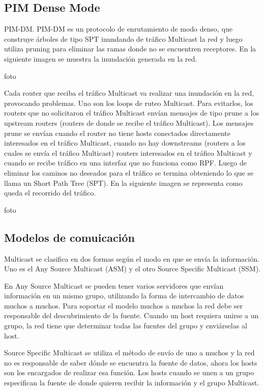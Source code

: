 \documentclass[12pt,a4paper,oneside]{book}
\begin{document}
\subsection{PIM Dense Mode}
\label{pimdm}

PIM-DM.
	PIM-DM es un protocolo de enrutamiento de modo denso, que construye árboles de tipo SPT inundando de tráfico Multicast la red y luego utiliza  pruning para eliminar las ramas donde no se encuentren receptores. 
	En la siguiente imagen se muestra la inundación generada en la red.

foto

Cada router que reciba el tráfico Multicast va realizar una inundación en la red, provocando problemas. Uno son los loops de ruteo Multicast. Para evitarlos, los routers que no solicitaron el tráfico Multicast envían mensajes de tipo prune a los upstream routers (routers de donde se recibe el tráfico Multicast). Los mensajes prune se envían cuando el router no tiene hosts conectados directamente interesados en el tráfico Multicast, cuando no hay downstreams (routers a los cuales se envía el tráfico Multicast) routers interesados en el tráfico Multicast y cuando se recibe tráfico en una interfaz que no funciona como RPF.
	Luego de eliminar los caminos no deseados para el tráfico se termina obteniendo lo que se llama un Short Path Tree (SPT). En la siguiente imagen se representa como queda el recorrido del tráfico.


foto

\subsection{Modelos de comuicación}

Multicast se clasifica en dos formas según el modo en que se envía la información. Uno es el Any Source Multicast (ASM) y el otro Source Specific Multicast (SSM). 
	
En Any Source Multicast se pueden tener varios servidores que envían información en un mismo grupo, utilizando la forma de intercambio de datos muchos a muchos. Para soportar el modelo muchos a muchos la red debe ser responsable del descubrimiento de la fuente. Cuando un host requiera unirse a un grupo, la red tiene que determinar todas las fuentes del grupo y enviárselas al host.
	
Source Specific Multicast se utiliza el método de envío de uno a muchos y la red no es responsable de saber dónde se encuentra la fuente de datos, ahora los hosts son los encargados de realizar esa función. Los hosts cuando se unen a un grupo especifican la fuente de donde quieren recibir la información y el grupo Multicast.
	
\end{document}
